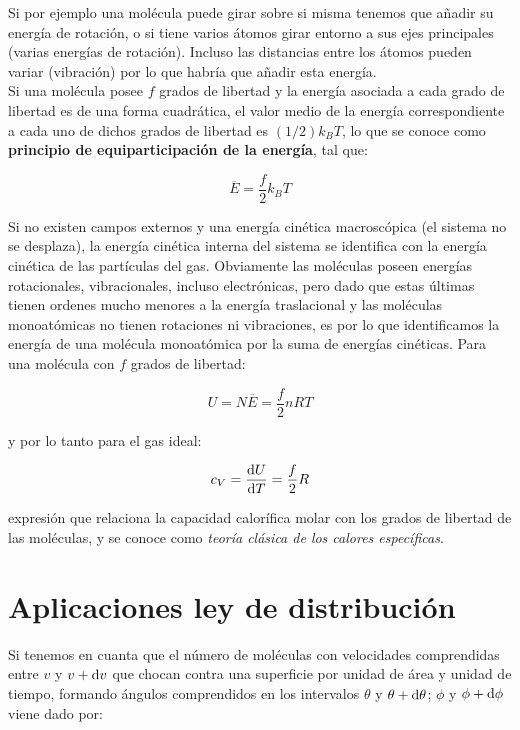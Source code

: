 \documentclass[12pt,a4paper,oneside]{book}
\begin{document}
Si por ejemplo una molécula puede girar sobre si misma tenemos que añadir su energía de rotación, o si tiene varios átomos girar entorno a sus ejes principales (varias energías de rotación). Incluso las distancias entre los átomos pueden variar (vibración) por lo que habría que añadir esta energía. \\
 
Si una molécula posee $f$ grados de libertad y la energía asociada a cada grado de libertad es de una forma cuadrática, el valor medio de la energía correspondiente a cada uno de dichos grados de libertad es $(1/2)k_B T$, lo que se conoce como \textbf{principio de equiparticipación de la energía}, tal que:

\begin{equation}
\overline{E} = \frac{f}{2} k_B T
\end{equation}

Si no existen campos externos y una energía cinética macroscópica (el sistema no se desplaza), la energía cinética interna del sistema se identifica con la energía cinética de las partículas del gas. Obviamente las moléculas poseen energías rotacionales, vibracionales, incluso electrónicas, pero dado que estas últimas tienen ordenes mucho menores a la energía traslacional y las moléculas monoatómicas no tienen rotaciones ni vibraciones, es por lo que identificamos la energía de una molécula monoatómica por la suma de energías cinéticas. Para una molécula con $f$ grados de libertad:

\begin{equation}
U = N \overline{E} = \dfrac{f}{2} n RT
\end{equation}

y por lo tanto para el gas ideal:

\begin{equation}
c_V = \dfrac{\mathrm{d} U}{\mathrm{d} T} = \dfrac{f}{2} R
\end{equation}

expresión que relaciona la capacidad calorífica molar con los grados de libertad de las moléculas, y se conoce como \textit{teoría clásica de los calores específicas}.

\section{Aplicaciones ley de distribución}

Si tenemos en cuanta que el número de moléculas con velocidades comprendidas entre $v$ y $v + \mathrm{d} v$ que chocan contra una superficie por unidad de área y unidad de tiempo, formando ángulos comprendidos en los intervalos $\theta$ y  $\theta + \mathrm{d} \theta$; $\phi$ y $\phi + \mathrm{d} \phi$ viene dado por:
\end{document}
